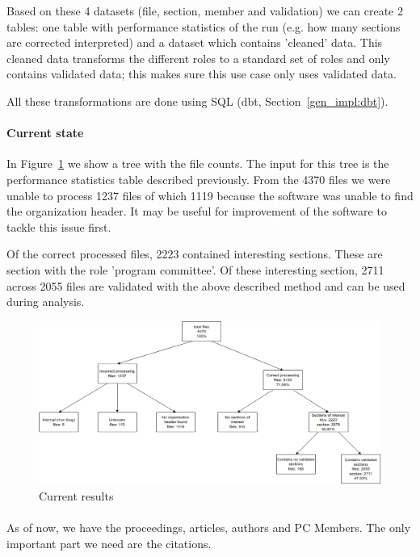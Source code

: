\documentclass{ou-report}
\begin{document}
Based on these 4 datasets (file, section, member and validation) we can create
2 tables: one table with performance statistics of the run (e.g. how many
sections are corrected interpreted) and a dataset which contains 'cleaned'
data. This cleaned data transforms the different roles to a standard set of 
roles and only contains validated data; this makes sure this use case only uses
validated data.

All these transformations are done using SQL (dbt, Section~\ref{gen_impl:dbt}).

\paragraph{Current state}
In Figure~\ref{fig:front_matter_result} we show a tree with the file counts.
The input for this tree is the performance statistics table described 
previously.
From the 4370 files we were unable to process 1237 files of which 1119 
because the software was unable to find the organization header. It may be
useful for improvement of the software to tackle this issue first.

Of the correct processed files, 2223 contained interesting sections. These are
section with the role 'program committee'. Of these interesting section, 2711
across 2055 files are validated with the above described method and can be used
during analysis.

\begin{figure}[H]
    \centering
    \includegraphics[width=17cm]{images/lncs_front_matter_result.png}
    \caption{Current results}
    \label{fig:front_matter_result}
\end{figure}

\paragraph{}
As of now, we have the proceedings, articles, authors and PC Members. The only
important part we need are the citations.
\end{document}
